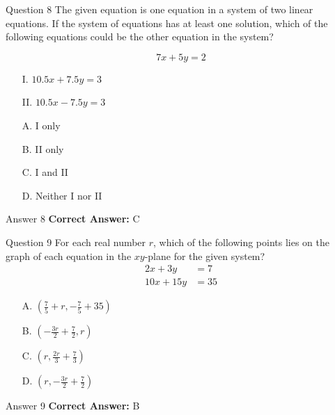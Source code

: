 \documentclass{beamer}
\begin{document}
\begin{frame}{Question 8}
\small
The given equation is one equation in a system of two linear equations.  
If the system of equations has at least one solution, which of the following equations could be the other equation in the system?

\[
7x + 5y = 2
\]

\begin{itemize}
    \item[I.] \(10.5x + 7.5y = 3\)
    \item[II.] \(10.5x - 7.5y = 3\)
\end{itemize}
\vspace{0.35cm}
\begin{enumerate}
    \item[A.] I only
    \item[B.] II only
    \item[C.] I and II
    \item[D.] Neither I nor II
\end{enumerate}
\end{frame}
\begin{frame}{Answer 8}
\small
\textbf{Correct Answer:} C
\end{frame}

\begin{frame}{Question 9}
\small
For each real number \( r \), which of the following points lies on the graph of each equation in the \( xy \)-plane for the given system?
\[
\begin{aligned}
2x + 3y &= 7 \\
10x + 15y &= 35
\end{aligned}
\]
\vspace{0.35cm}
\begin{enumerate}
    \item[A.] $\left(\frac{7}{5} + r, -\frac{7}{5} + 35 \right)$
    \item[B.] $\left(-\frac{3r}{2} + \frac{7}{2}, r \right)$
    \item[C.] $\left(r, \frac{2r}{3} + \frac{7}{3} \right)$
    \item[D.] $\left(r, -\frac{3r}{2} + \frac{7}{2} \right)$
\end{enumerate}
\end{frame}
\begin{frame}{Answer 9}
\small
\textbf{Correct Answer:} B
\end{frame}
\end{document}
